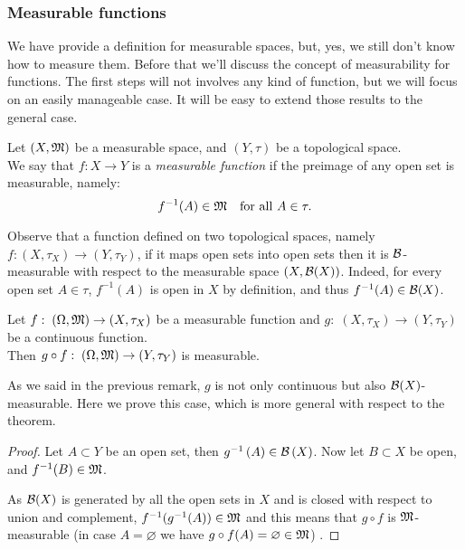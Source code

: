 \subsubsection{Measurable functions}

We have provide a definition for measurable spaces, but, yes, we still don't know how to measure them. Before that we'll discuss the concept of measurability for functions. The first steps will not involves any kind of function, but we will focus on an easily manageable case. It will be easy to extend those results to the general case.

\begin{defn}
  	Let $(X, \mathfrak M)$ be a measurable space, and $(Y, \tau)$ be a topological space. \\
  	We say that $f: X \to Y$ is a \emph{measurable function} if the preimage of any open set is measurable, namely:
  	$$
  		f^{-1}(A) \in \mathfrak M 
  		\quad \text{for all } A \in \tau
  	.
  	$$
\end{defn}

Observe that a function defined on two topological spaces, namely $f:(X, \tau_X) \to (Y, \tau_Y)$, if it maps open sets into open sets then it is $\mathcal B$-measurable with respect to the measurable space $(X, \mathcal B(X))$. Indeed, for every open set $A \in \tau$, $f^{-1}(A)$ is open in $X$ by definition, and thus $f^{-1}(A) \in \mathcal B(X)$.

\begin{theo}
	Let $f:\; (\Omega, \mathfrak M) \to (X, \tau_X)$ be a measurable function and $g:\; (X, \tau_X) \to (Y, \tau_Y)$ be a continuous function.\\
	Then $g \circ f:\; \left(\Omega,\mathfrak M \right)\to \left(Y,\tau_Y\right)$ is measurable.
\end{theo}
As we said in the previous remark, $g$ is not only continuous but also $\mathcal B(X)$-measurable. Here we prove this case, which is more general with respect to the theorem.
\begin{proof}
	Let $A \subset Y$ be an open set, then $g^{-1}\left(A\right)\in \mathcal B\left(X\right)$. Now let $B \subset X$ be open, and $f^{-1}(B) \in \mathfrak M$.
	
	As $\mathcal B(X)$ is generated by all the open sets in $X$ and is closed with respect to union and complement, $f^{-1}(g^{-1}(A)) \in \mathfrak M$ and this means that $g\circ f$ is $\mathfrak M$-measurable (in case $A = \varnothing$ we have $g\circ f (A) = \varnothing \in \mathfrak M$) .
\end{proof}

